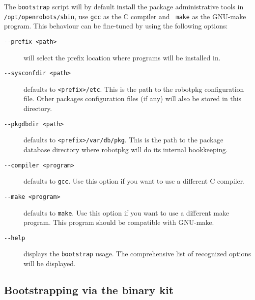 The {\tt bootstrap} script will by default install the package administrative
tools in {\tt /opt/openrobots/sbin}, use {\tt gcc} as the C compiler and {\tt
make} as the GNU-make program. This behaviour can be fine-tuned by using the
following options:

\begin{description}
   \item[\tt   -{}-prefix <path>]   will   select the  prefix  location where
   programs will be installed in.

   \item[\tt -{}-sysconfdir <path>] defaults to {\tt <prefix>/etc}. This is the
   path to the robotpkg configuration file.  Other packages configuration files
   (if any) will also be stored in this directory.

   \item[\tt -{}-pkgdbdir  <path>] defaults to {\tt  <prefix>/var/db/pkg}. This
   is the path  to the package database  directory  where robotpkg will  do its
   internal bookkeeping.

   \item[\tt -{}-compiler <program>] defaults to {\tt gcc}.  Use this option if
   you want to use a different C compiler.

   \item[\tt -{}-make <program>] defaults to {\tt make}. Use this option if you
   want to use a different make program. This program should be compatible with
   GNU-make.

   \item[\tt -{}-help]  displays  the {\tt bootstrap} usage.  The comprehensive
   list of recognized options will be displayed.
\end{description}


\subsection{Bootstrapping via the binary kit} %
